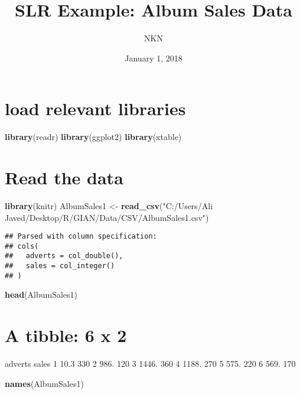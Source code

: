 \documentclass[]{article}
\title{SLR Example: Album Sales Data}
\author{NKN}
\date{January 1, 2018}
\newenvironment{Shaded}{\begin{snugshade}}{\end{snugshade}}
\newcommand{\KeywordTok}[1]{\textcolor[rgb]{0.13,0.29,0.53}{\textbf{#1}}}
\newcommand{\StringTok}[1]{\textcolor[rgb]{0.31,0.60,0.02}{#1}}
\newcommand{\NormalTok}[1]{#1}
\begin{document}
\maketitle

\section{load relevant libraries}\label{load-relevant-libraries}

\begin{Shaded}
\begin{Highlighting}[]
\KeywordTok{library}\NormalTok{(readr)}
\KeywordTok{library}\NormalTok{(ggplot2)}
\KeywordTok{library}\NormalTok{(xtable)}
\end{Highlighting}
\end{Shaded}

\section{Read the data}\label{read-the-data}

\begin{Shaded}
\begin{Highlighting}[]
\KeywordTok{library}\NormalTok{(knitr)}
\NormalTok{AlbumSales1 <-}\StringTok{ }\KeywordTok{read_csv}\NormalTok{(}\StringTok{"C:/Users/Ali Javed/Desktop/R/GIAN/Data/CSV/AlbumSales1.csv"}\NormalTok{)}
\end{Highlighting}
\end{Shaded}

\begin{verbatim}
## Parsed with column specification:
## cols(
##   adverts = col_double(),
##   sales = col_integer()
## )
\end{verbatim}

\begin{Shaded}
\begin{Highlighting}[]
\KeywordTok{head}\NormalTok{(AlbumSales1)}
\end{Highlighting}
\end{Shaded}

\section{A tibble: 6 x 2}\label{a-tibble-6-x-2}

adverts sales 1 10.3 330 2 986. 120 3 1446. 360 4 1188. 270 5 575. 220 6
569. 170

\begin{Shaded}
\begin{Highlighting}[]
\KeywordTok{names}\NormalTok{(AlbumSales1)}
\end{Highlighting}
\end{Shaded}
\end{document}
